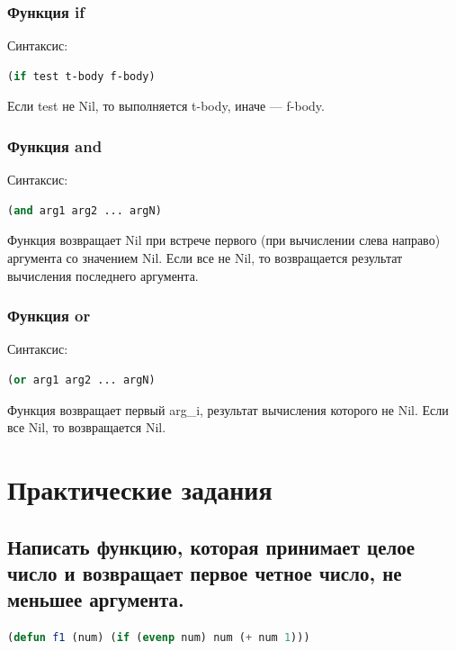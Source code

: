 \documentclass[12pt]{report}
\begin{document}
\subsection{Функция if}

Синтаксис:

\begin{lstlisting}[language=Lisp]
(if test t-body f-body)
\end{lstlisting}

Если test не Nil, то выполняется t-body, иначе --- \mbox{f-body}.

\subsection{Функция and}

Синтаксис:

\begin{lstlisting}[language=Lisp]
(and arg1 arg2 ... argN)
\end{lstlisting}

Функция возвращает Nil при встрече первого (при вычислении слева направо)
аргумента со значением Nil. Если
все не Nil, то возвращается результат вычисления последнего аргумента.

\subsection{Функция or}

Синтаксис:

\begin{lstlisting}[language=Lisp]
(or arg1 arg2 ... argN)
\end{lstlisting}

Функция возвращает первый arg\_i, результат вычисления которого не
Nil. Если все Nil, то возвращается Nil.


	
\chapter{Практические задания}	

\section{Написать функцию, которая принимает целое число и возвращает первое
четное число, не меньшее аргумента.}

\begin{lstlisting}[language=Lisp]
(defun f1 (num) (if (evenp num) num (+ num 1)))
\end{lstlisting}
\end{document}
